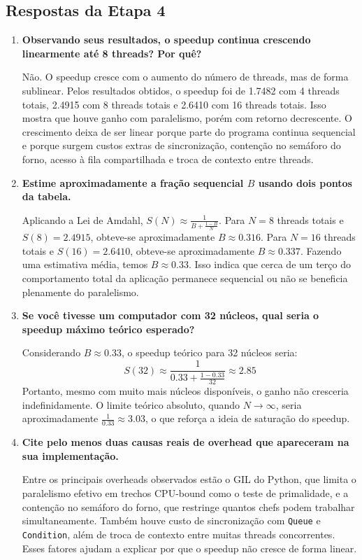 \documentclass[12pt,a4paper]{article}
\begin{document}
\subsection{Respostas da Etapa 4}
\begin{enumerate}
    \item \textbf{Observando seus resultados, o speedup continua crescendo linearmente at\'e 8 threads? Por qu\^e?}

    N\~ao. O speedup cresce com o aumento do n\'umero de threads, mas de forma sublinear. Pelos resultados obtidos, o speedup foi de 1.7482 com 4 threads totais, 2.4915 com 8 threads totais e 2.6410 com 16 threads totais. Isso mostra que houve ganho com paralelismo, por\'em com retorno decrescente. O crescimento deixa de ser linear porque parte do programa continua sequencial e porque surgem custos extras de sincroniza\c{c}\~ao, conten\c{c}\~ao no sem\'aforo do forno, acesso \`a fila compartilhada e troca de contexto entre threads.

    \item \textbf{Estime aproximadamente a fra\c{c}\~ao sequencial \(B\) usando dois pontos da tabela.}

    Aplicando a Lei de Amdahl, \(S(N) \approx \frac{1}{B + \frac{1-B}{N}}\). Para \(N = 8\) threads totais e \(S(8) = 2.4915\), obteve-se aproximadamente \(B \approx 0.316\). Para \(N = 16\) threads totais e \(S(16) = 2.6410\), obteve-se aproximadamente \(B \approx 0.337\). Fazendo uma estimativa m\'edia, temos \(B \approx 0.33\). Isso indica que cerca de um ter\c{c}o do comportamento total da aplica\c{c}\~ao permanece sequencial ou n\~ao se beneficia plenamente do paralelismo.

    \item \textbf{Se voc\^e tivesse um computador com 32 n\'ucleos, qual seria o speedup m\'aximo te\'orico esperado?}

    Considerando \(B \approx 0.33\), o speedup te\'orico para 32 n\'ucleos seria:
    \[
    S(32) \approx \frac{1}{0.33 + \frac{1 - 0.33}{32}} \approx 2.85
    \]
    Portanto, mesmo com muito mais n\'ucleos dispon\'iveis, o ganho n\~ao cresceria indefinidamente. O limite te\'orico absoluto, quando \(N \to \infty\), seria aproximadamente \(\frac{1}{0.33} \approx 3.03\), o que refor\c{c}a a ideia de satura\c{c}\~ao do speedup.

    \item \textbf{Cite pelo menos duas causas reais de overhead que apareceram na sua implementa\c{c}\~ao.}

    Entre os principais overheads observados est\~ao o GIL do Python, que limita o paralelismo efetivo em trechos CPU-bound como o teste de primalidade, e a conten\c{c}\~ao no sem\'aforo do forno, que restringe quantos chefs podem trabalhar simultaneamente. Tamb\'em houve custo de sincroniza\c{c}\~ao com \texttt{Queue} e \texttt{Condition}, al\'em de troca de contexto entre muitas threads concorrentes. Esses fatores ajudam a explicar por que o speedup n\~ao cresce de forma linear.
\end{enumerate}
\end{document}
